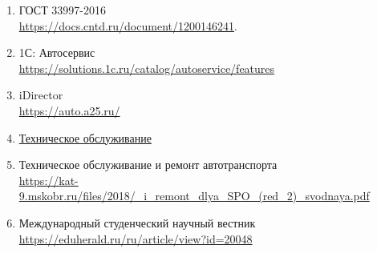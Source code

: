 \begin{enumerate}
	\item ГОСТ 33997-2016 \\
	\url{https://docs.cntd.ru/document/1200146241}.
		\label{ref:ГОСТ-требования-то}

	\item 1С: Автосервис\\
		\url{https://solutions.1c.ru/catalog/autoservice/features}
		\label{ref:1С-автосервис}

	\item iDirector\\
		\url{https://auto.a25.ru/}
		\label{ref:iDirector}

	\item \href{http://абсолютпб.рф/техническое-обслуживание}{Техническое
		обслуживание}
		\label{ref:техническое-обслуживание}

	\item Техническое обслуживание и ремонт автотранспорта \\
		\url{https://kat-9.mskobr.ru/files/2018/_i_remont_dlya_SPO_(red_2)_svodnaya.pdf}
		\label{ref:му-ремонт-и-техническое-обслуживание}

	\item Международный студенческий научный вестник\\
		\url{https://eduherald.ru/ru/article/view?id=20048}
		\label{ref:er-диаграммы}


\end{enumerate}
